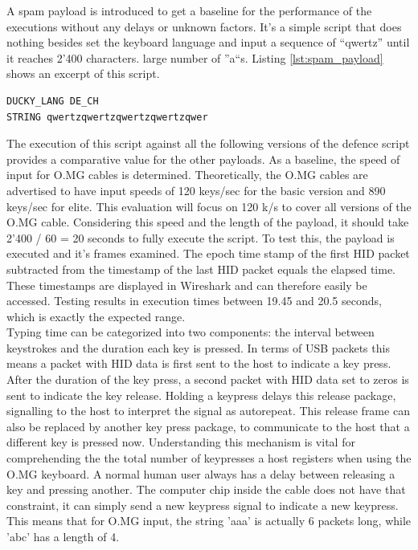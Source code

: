 A spam payload is introduced to get a baseline for the performance of the executions without any delays or unknown factors. It's a simple script that does nothing besides set the keyboard language and input a sequence of ``qwertz'' until it reaches 2’400 characters.  large number of ''a``s. Listing \ref{lst:spam_payload} shows an excerpt of this script. 


\begin{lstlisting}[caption={Excerpt: write a string of length 2'400 without delays},label=lst:spam_payload, captionpos=b]
DUCKY_LANG DE_CH
STRING qwertzqwertzqwertzqwertzqwer
\end{lstlisting}

The execution of this script against all the following versions of the defence script provides a comparative value for the other payloads.
As a baseline, the speed of input for O.MG cables is determined. Theoretically, the O.MG cables are advertised to have input speeds of 120 keys/sec for the basic version and 890 keys/sec for elite. This evaluation will focus on 120 k/s to cover all versions of the O.MG cable. Considering this speed and the length of the payload, it should take 2'400 / 60 = 20 seconds to fully execute the script. To test this, the payload is executed and it's frames examined. The epoch time stamp of the first HID packet subtracted from the timestamp of the last HID packet equals the elapsed time. These timestamps are displayed in Wireshark and can therefore easily be accessed. Testing results in execution times between 19.45 and 20.5 seconds, which is exactly the expected range. \\
Typing time can be categorized into two components: the interval between keystrokes and the duration each key is pressed. In terms of USB packets this means a packet with HID data is first sent to the host to indicate a key press. After the duration of the key press, a second packet with HID data set to zeros is sent to indicate the key release. Holding a keypress delays this release package, signalling to the host to interpret the signal as autorepeat. This release frame can also be replaced by another key press package, to communicate to the host that a different key is pressed now. Understanding this mechanism is vital for comprehending the the total number of keypresses a host registers when using the O.MG keyboard. A normal human user always has a delay between releasing a key and pressing another. The computer chip inside the cable does not have that constraint, it can simply send a new keypress signal to indicate a new keypress. This means that for O.MG input, the string 'aaa' is actually 6 packets long, while 'abc' has a length of 4. 

